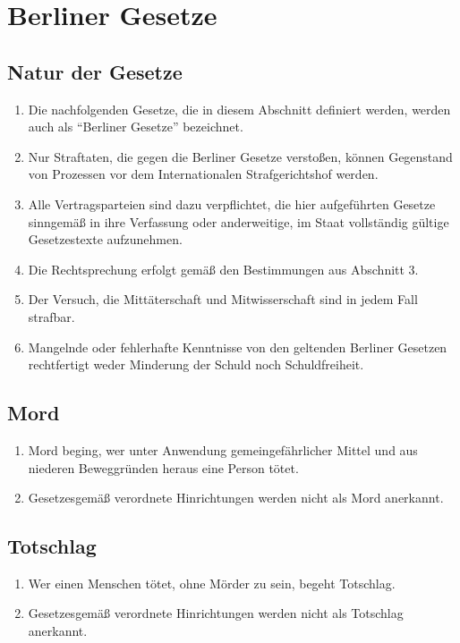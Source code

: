\documentclass{article}
\begin{document}
\section{Berliner Gesetze}
\subsection{Natur der Gesetze}
\begin{enumerate}[(1)]
    \item Die nachfolgenden Gesetze, die in diesem Abschnitt definiert werden, werden auch als ``Berliner Gesetze'' bezeichnet.
    \item Nur Straftaten, die gegen die Berliner Gesetze verstoßen, können Gegenstand von Prozessen vor dem Internationalen Strafgerichtshof werden.
    \item Alle Vertragsparteien sind dazu verpflichtet, die hier aufgeführten Gesetze sinngemäß in ihre Verfassung oder anderweitige, im Staat vollständig gültige Gesetzestexte aufzunehmen.
    \item Die Rechtsprechung erfolgt gemäß den Bestimmungen aus Abschnitt 3.
    \item Der Versuch, die Mittäterschaft und Mitwisserschaft sind in jedem Fall strafbar.
    \item Mangelnde oder fehlerhafte Kenntnisse von den geltenden Berliner Gesetzen rechtfertigt weder Minderung der Schuld noch Schuldfreiheit.
\end{enumerate}

\subsection{Mord}
\begin{enumerate}[(1)]
    \item Mord beging, wer unter Anwendung gemeingefährlicher Mittel und aus niederen Beweggründen heraus eine Person tötet.
    \item Gesetzesgemäß verordnete Hinrichtungen werden nicht als Mord anerkannt.
\end{enumerate}

\subsection{Totschlag}
\begin{enumerate}[(1)]
    \item Wer einen Menschen tötet, ohne Mörder zu sein, begeht Totschlag.
    \item Gesetzesgemäß verordnete Hinrichtungen werden nicht als Totschlag anerkannt.
\end{enumerate}
\end{document}
